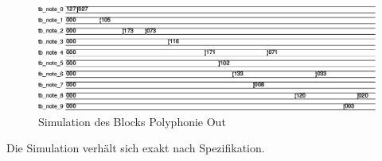 \begin{figure}[H]
	\includegraphics[width=1\textwidth]{images/midi_interface/tb_polyphonie.png}
	\caption{Simulation des Blocks Polyphonie Out }
	\label{fig.polyphnie_simulation}
\end{figure}

Die Simulation verhält sich exakt nach Spezifikation.
